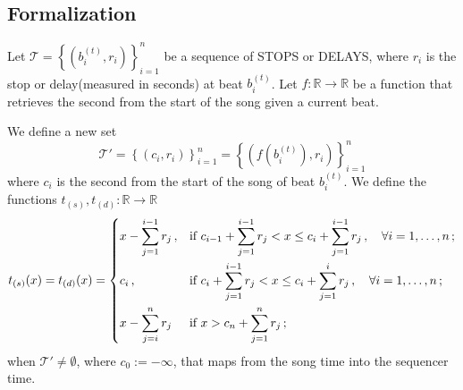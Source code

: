 \documentclass[a4paper,9pt]{article}
\begin{document}
\subsection{Formalization}


Let $ \mathcal{T} =  \left\{\left( b_i^{(t)}, r_i \right)\right\}_{i=1}^{n} $ be a sequence of STOPS or DELAYS, where $ r_i $ is the stop or delay(measured in seconds) at beat $ b_i^{(t)} $. Let $ f:\mathbb{R}\rightarrow \mathbb{R} $ be a function that retrieves the second from the start of the song given a current beat.

We define a new set 
\begin{equation}
	\mathcal{T'} = \left\{\left( c_i, r_i \right)\right\}_{i=1}^{n} = \left\{\left( f\left( b_i^{(t)}\right), r_i \right)\right\}_{i=1}^{n}
	\label{eq:tprimeset}
\end{equation}
where $ c_i $ is the second from the start of the song of beat $ b_i^{(t)} $.
We define the functions $ t_{(s)}, t_{(d)}: \mathbb{R}\rightarrow \mathbb{R} $
\begin{equation}
	t_{(s)}(x) = t_{(d)}(x) = \begin{dcases}
		x - \sum_{j=1}^{i-1}r_j\,, & \text{if $ c_{i-1} + \sum_{j=1}^{i-1}r_j < x \leq c_i + \sum_{j=1}^{i-1}r_j\,, \quad \forall i=1,\dots,n$}\,;\\
		c_i\,, & \text{if $ c_i + \sum_{j=1}^{i-1}r_j < x \leq c_i + \sum_{j=1}^i r_j\,,\quad \forall i=1,\dots,n $}\,;\\
		x - \sum_{j=i}^n r_j & \text{if $ x > c_n + \sum_{j=1}^n r_j $}\,; 
	\end{dcases}
	\label{eq:t}
\end{equation}
when $ \mathcal{T'} \neq \emptyset $, where $ c_0 := -\infty $,  that maps from the song time into the sequencer time. 
\end{document}
